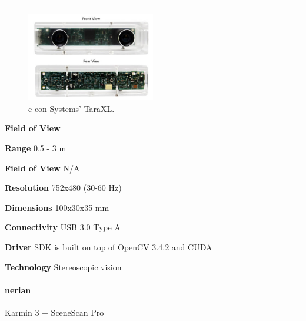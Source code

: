 \documentclass[../main.tex]{subfiles}
\begin{document}
\noindent\rule{8cm}{0.1pt}
\begin{figure}[H]
    \centering
    \includegraphics[width=0.5\textwidth]{images/TaraXL.png}
    \caption{e-con Systems' TaraXL.}
    \label{fig:TaraXL}
\end{figure}
\begin{labeling}{\textbf{Field of View    }}
    \setlength{\itemindent}{2em}
    \item [\textbf{Range}] 0.5 - 3 m
    \item [\textbf{Field of View}] N/A
    \item [\textbf{Resolution}] 752x480 (30-60 Hz)
    \item [\textbf{Dimensions}] 100x30x35 mm
    \item [\textbf{Connectivity}] USB 3.0 Type A
    \item [\textbf{Driver}] SDK is built on top of OpenCV 3.4.2 and CUDA
    \item [\textbf{Technology}] Stereoscopic vision
\end{labeling}
\vspace{1em}
\paragraph{\large \textbf{nerian}} {\large Karmin 3 + SceneScan Pro}
\end{document}
